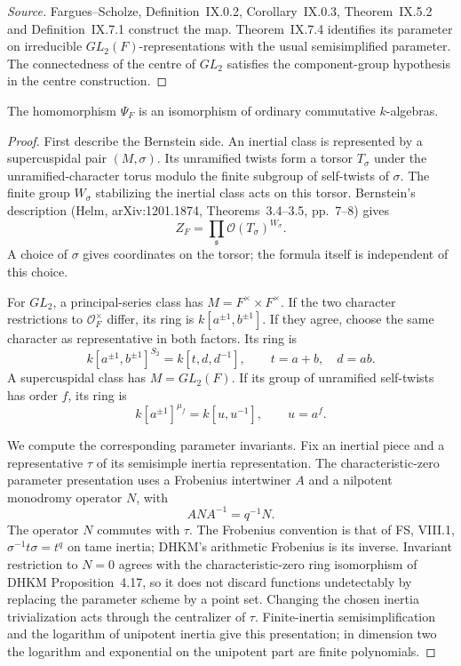 \begin{proof}[Source]
Fargues--Scholze, Definition~IX.0.2, Corollary~IX.0.3,
Theorem~IX.5.2 and Definition~IX.7.1 construct the map.
Theorem~IX.7.4 identifies its parameter on irreducible
\(GL_2(F)\)-representations with the usual semisimplified
parameter. The connectedness of the centre of \(GL_2\)
satisfies the component-group hypothesis in the centre
construction.
\end{proof}

\begin{proposition}
\label{v4-arith:w10-e:prop:excursion-bernstein}
\ClaimStatusProvedHere
The homomorphism \(\Psi_F\) is an isomorphism of ordinary
commutative \(k\)-algebras.
\end{proposition}

\begin{proof}
First describe the Bernstein side. An inertial class is
represented by a supercuspidal pair \((M,\sigma)\).
Its unramified twists form a torsor \(T_\sigma\) under
the unramified-character torus modulo the finite subgroup
of self-twists of \(\sigma\). The finite group \(W_\sigma\)
stabilizing the inertial class acts on this torsor.
Bernstein's description (Helm, arXiv:1201.1874,
Theorems~3.4--3.5, pp.~7--8) gives
\[
 Z_F=\prod_{\mathfrak s}\mathcal O(T_\sigma)^{W_\sigma}.
\]
A choice of \(\sigma\) gives coordinates on the torsor;
the formula itself is independent of this choice.

For \(GL_2\), a principal-series class has
\(M=F^\times\times F^\times\). If the two character
restrictions to \(\mathcal O_F^\times\) differ, its ring is
\(k[a^{\pm1},b^{\pm1}]\). If they agree, choose the same
character as representative in both factors. Its ring is
\[
 k[a^{\pm1},b^{\pm1}]^{S_2}
   =k[t,d,d^{-1}],\qquad t=a+b,\quad d=ab.
\]
A supercuspidal class has \(M=GL_2(F)\). If its group of
unramified self-twists has order \(f\), its ring is
\[
 k[a^{\pm1}]^{\mu_f}=k[u,u^{-1}],\qquad u=a^f.
\]

We compute the corresponding parameter invariants.
Fix an inertial piece and a representative \(\tau\) of
its semisimple inertia representation. The
characteristic-zero parameter presentation uses a
Frobenius intertwiner \(A\) and a nilpotent monodromy
operator \(N\), with
\[
 A N A^{-1}=q^{-1}N.
\]
The operator \(N\) commutes with \(\tau\).
The Frobenius convention is that of FS, VIII.1,
$\sigma^{-1}t\sigma=t^q$ on tame inertia; DHKM's arithmetic
Frobenius is its inverse. Invariant restriction to $N=0$
agrees with the characteristic-zero ring isomorphism of
DHKM Proposition~4.17, so it does not discard functions
undetectably by replacing the parameter scheme by a point set.
Changing the chosen inertia trivialization acts through
the centralizer of \(\tau\). Finite-inertia
semisimplification and the logarithm of unipotent inertia
give this presentation; in dimension two the logarithm
and exponential on the unipotent part are finite
polynomials.


\end{proof}
